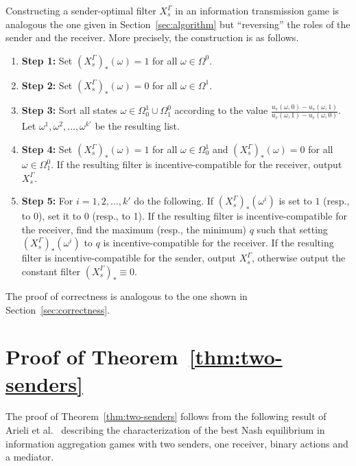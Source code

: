\documentclass[submission,copyright,creativecommons]{eptcs}
\begin{document}
Constructing a sender-optimal filter $X_s^\Gamma$ in an information transmission game is analogous the one given in Section~\ref{sec:algorithm} but ``reversing'' the roles of the sender and the receiver. More precisely, the construction is as follows.

\begin{enumerate}
\item \textbf{Step 1:} Set $(X_s^\Gamma)_*(\omega) = 1$ for all $\omega \in \Omega^0$.
\item \textbf{Step 2:} Set $(X_s^\Gamma)_*(\omega) = 0$ for all $\omega \in \Omega^1$.
\item \textbf{Step 3:} Sort all states $\omega \in \Omega_{0}^1 \cup \Omega_1^0$ according to the value $\frac{u_s(\omega, 0) - u_s(\omega, 1)}{u_r(\omega, 1) - u_r(\omega, 0)}$. Let $\omega^1, \omega^2, \ldots, \omega^{k'}$ be the resulting list.
\item \textbf{Step 4:} Set $(X_s^\Gamma)_*(\omega) = 1$ for all $\omega \in \Omega_0^1$ and $(X_s^\Gamma)_*(\omega) = 0$ for all $\omega \in \Omega_1^0$. If the resulting filter is incentive-compatible for the receiver, output $X_s^\Gamma$.
\item \textbf{Step 5:} For $i = 1, 2, \ldots, k'$ do the following. If $(X_s^\Gamma)_*(\omega^i)$ is set to $1$ (resp., to $0$), set it to $0$ (resp., to 1). If the resulting filter is incentive-compatible for the receiver, find the maximum (resp., the minimum) $q$ such that setting $(X_s^\Gamma)_*(\omega^i)$ to $q$ is incentive-compatible for the receiver. If the resulting filter  is incentive-compatible for the sender, output $X_s^\Gamma$, otherwise output the constant filter $(X_s^\Gamma)_* \equiv 0$.
\end{enumerate}

The proof of correctness is analogous to the one shown in Section~\ref{sec:correctness}.

\section{Proof of Theorem~\ref{thm:two-senders}}\label{sec:proof-2-senders}

The proof of Theorem~\ref{thm:two-senders} follows from the following result of Arieli et al.~\cite{arieli2023mediated} describing the characterization of the best Nash equilibrium in information aggregation games with two senders, one receiver, binary actions and a mediator.
\end{document}

